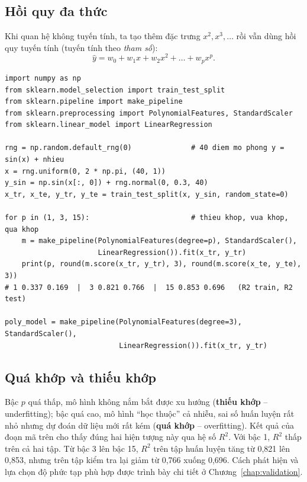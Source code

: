 \subsection{Hồi quy đa thức}

Khi quan hệ không tuyến tính, ta tạo thêm đặc trưng $x^2, x^3, \dots$ rồi vẫn dùng hồi quy tuyến tính (tuyến tính theo \textit{tham số}):
\begin{equation}
    \hat{y} = w_0 + w_1 x + w_2 x^2 + \dots + w_p x^p .
\end{equation}

\begin{lstlisting}[caption={Hồi quy đa thức với PolynomialFeatures}]
import numpy as np
from sklearn.model_selection import train_test_split
from sklearn.pipeline import make_pipeline
from sklearn.preprocessing import PolynomialFeatures, StandardScaler
from sklearn.linear_model import LinearRegression

rng = np.random.default_rng(0)              # 40 diem mo phong y = sin(x) + nhieu
x = rng.uniform(0, 2 * np.pi, (40, 1))
y_sin = np.sin(x[:, 0]) + rng.normal(0, 0.3, 40)
x_tr, x_te, y_tr, y_te = train_test_split(x, y_sin, random_state=0)

for p in (1, 3, 15):                        # thieu khop, vua khop, qua khop
    m = make_pipeline(PolynomialFeatures(degree=p), StandardScaler(),
                      LinearRegression()).fit(x_tr, y_tr)
    print(p, round(m.score(x_tr, y_tr), 3), round(m.score(x_te, y_te), 3))
# 1 0.337 0.169  |  3 0.821 0.766  |  15 0.853 0.696   (R2 train, R2 test)

poly_model = make_pipeline(PolynomialFeatures(degree=3), StandardScaler(),
                           LinearRegression()).fit(x_tr, y_tr)
\end{lstlisting}

\subsection{Quá khớp và thiếu khớp}

Bậc $p$ quá thấp, mô hình không nắm bắt được xu hướng (\textbf{thiếu khớp} -- underfitting); bậc quá cao, mô hình ``học thuộc'' cả nhiễu, sai số huấn luyện rất nhỏ nhưng dự đoán dữ liệu mới rất kém (\textbf{quá khớp} -- overfitting). Kết quả của đoạn mã trên cho thấy đúng hai hiện tượng này qua hệ số $R^2$. Với bậc 1, $R^2$ thấp trên cả hai tập. Từ bậc 3 lên bậc 15, $R^2$ trên tập huấn luyện tăng từ 0,821 lên 0,853, nhưng trên tập kiểm tra lại giảm từ 0,766 xuống 0,696. Cách phát hiện và lựa chọn độ phức tạp phù hợp được trình bày chi tiết ở Chương~\ref{chap:validation}.

